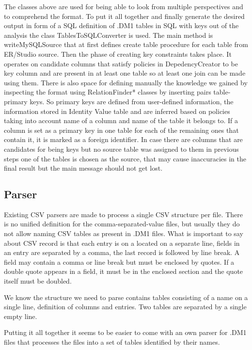 The classes above are used for being able to look from multiple perspectives and to comprehend the format.
To put it all together and finally generate the desired output in form of a SQL definition of .DM1 tables in SQL with keys out of the analysis the class TablesToSQLConverter is used.
The main method is writeMySQLSource that at first defines create table procedure for each table from ER/Studio source. 
Then the phase of creating key constraints takes place. It operates on candidate columns that satisfy policies in DepedencyCreator to be key column and are present in at least one table so at least one join can be made using them.
There is also space for defining manually the knowledge we gained by inspecting the format using RelationFinder* classes by inserting pairs table-primary keys.
So primary keys are defined from user-defined information, the information stored in Identity Value table and are inferred based on policies taking into account name of a column and name of the table it belongs to.
If a column is set as a primary key in one table for each of the remaining ones that contain it, it is marked as a foreign identifier.
In case there are columns that are candidates for being keys but no source table was assigned to them in previous steps one of the tables is chosen as the source, that may cause inaccuracies in the final result but the main message should not get lost.

\subsection{Parser}
\label{subsec:dm1_parser}

Existing CSV parsers are made to process a single CSV structure per file. There is no unified definition for the comma-separated-value files, but usually they do not allow naming CSV tables as present in .DM1 files.
What is important to say about CSV record is that each entry is on a located on a separate line, fields in an entry are separated by a comma, the last record is followed by line break. A field may contain a comma or line break but must be enclosed by quotes. 
If a double quote appears in a field, it must be in the enclosed section and the quote itself must be doubled.  

We know the structure we need to parse contains tables consisting of a name on a single line, definition of columns and entries. Two tables are separated by a single empty line.

Putting it all together it seems to be easier to come with an own parser for .DM1 files that processes the files into a set of tables identified by their names. 


